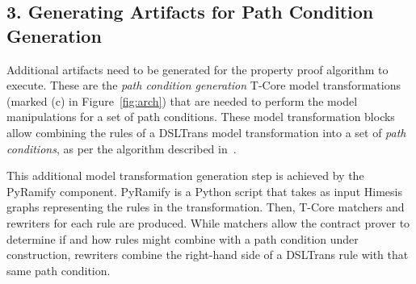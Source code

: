 





\subsection*{3. Generating Artifacts for Path Condition Generation}

Additional artifacts need to be generated for the property proof
algorithm to execute. These are the \emph{path condition generation} T-Core
model transformations (marked (c) in Figure~\ref{fig:arch}) that are needed to
perform the model manipulations for a set of path conditions. These model
transformation blocks allow combining the rules of a DSLTrans model
transformation into a set of \emph{path conditions}, as per the algorithm
described in~\cite{Lucio2014}.

This additional model transformation generation step is achieved by the PyRamify
component. PyRamify is a Python script that takes as input Himesis graphs
representing the rules in the transformation. Then, T-Core matchers and
rewriters for each rule are produced. While matchers allow the contract prover to determine
if and how rules might combine with a path condition under construction,
rewriters combine the right-hand side of a DSLTrans rule with that same path
condition.


